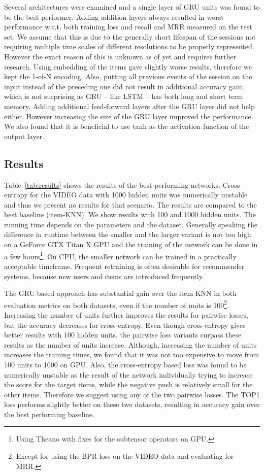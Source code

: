 Several architectures were examined and a single layer of GRU units was found to be the best performer. Adding addition layers always resulted in worst performance w.r.t. both training loss and recall and MRR measured on the test set. We assume that this is due to the generally short lifespan of the sessions not requiring multiple time scales of different resolutions to be properly represented. However the exact reason of this is unknown as of yet and requires further research. Using embedding of the items gave slightly worse results, therefore we kept the 1-of-N encoding. Also, putting all previous events of the session on the input instead of the preceding one did not result in additional accuracy gain; which is not surprising as GRU -- like LSTM -- has both long and short term memory. Adding additional feed-forward layers after the GRU layer did not help either. However increasing the size of the GRU layer improved the performance. We also found that it is beneficial to use tanh as the activation function of the output layer.

\subsection{Results}
Table~\ref{tab:results} shows the results of the best performing networks. Cross-entropy for the VIDEO data with 1000 hidden units was numerically unstable and thus we present no results for that scenario. The results are compared to the best baseline (item-KNN). We show results with 100 and 1000 hidden units. The running time depends on the parameters and the dataset. Generally speaking the difference in runtime between the smaller and the larger variant is not too high on a GeForce GTX Titan X GPU and the training of the network can be done in a few hours\footnote{Using Theano with fixes for the subtensor operators on GPU.}. On CPU, the smaller network can be trained in a practically acceptable timeframe. Frequent retraining is often desirable for recommender systems, because new users and items are introduced frequently.

The GRU-based approach has substantial gain over the item-KNN in both evaluation metrics on both datasets, even if the number of units is 100\footnote{Except for using the BPR loss on the VIDEO data and evaluating for MRR.}. Increasing the number of units further improves the results for pairwise losses, but the accuracy decreases for cross-entropy. Even though cross-entropy gives better results with 100 hidden units, the pairwise loss variants surpass these results as the number of units increase. Although, increasing the number of units increases the training times, we found that it was not too expensive to move from 100 units to 1000 on GPU. Also, the cross-entropy based loss was found to be numerically unstable as the result of the network individually trying to increase the score for the target items, while the negative push is relatively small for the other items. Therefore we suggest using any of the two pairwise losses. The TOP1 loss performs slightly better on these two datasets, resulting in  accuracy gain over the best performing baseline.

